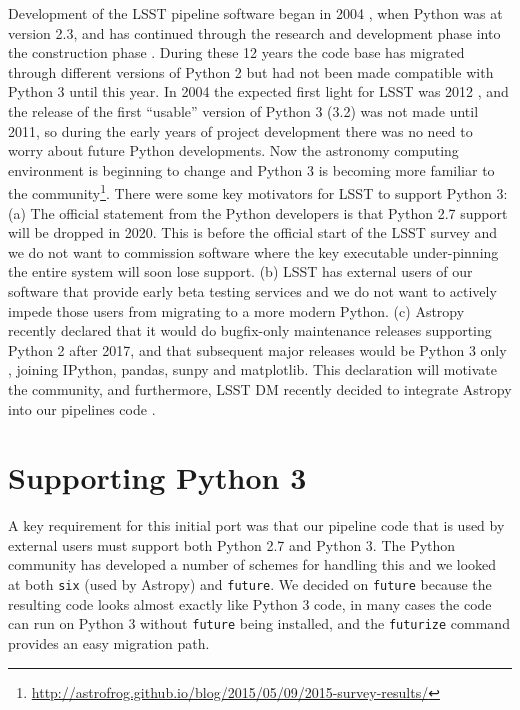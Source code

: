 \documentclass[11pt,twoside]{article}
\begin{document}
Development of the LSST pipeline software began in 2004 \citep{2004AAS...20510811A}, when Python was at version 2.3, and has continued through the research and development phase \citep{2010SPIE.7740E..15A} into the construction phase \citep{P056_adassxxv}.
During these 12 years the code base has migrated through different versions of Python 2 but had not been made compatible with Python 3 until this year.
In 2004 the expected first light for LSST was 2012 \citep{2004SPIE.5489..705C}, and the release of the first ``usable'' version of Python 3 (3.2) was not made until 2011, so during the early years of project development there was no need to worry about future Python developments.
Now the astronomy computing environment is beginning to change and Python 3 is becoming more familiar to the community\footnote{\url{http://astrofrog.github.io/blog/2015/05/09/2015-survey-results/}}.
There were some key motivators for LSST to support Python 3: (a) The official statement from the Python developers is that Python 2.7 support will be dropped in 2020.
This is before the official start of the LSST survey and we do not want to commission software where the key executable under-pinning the entire system will soon lose support.
(b) LSST has external users of our software that provide early beta testing services and we do not want to actively impede those users from migrating to a more modern Python.
(c) Astropy \citep{2013A&A...558A..33A} recently declared that it would do bugfix-only maintenance releases supporting Python 2 after 2017, and that subsequent major releases would be Python 3 only \citep{APE10}, joining IPython, pandas, sunpy and matplotlib. This declaration will motivate the community, and furthermore, LSST DM recently decided to integrate Astropy into our pipelines code \citep{doi:10.1117/12.2231313}.

\section{Supporting Python 3}

A key requirement for this initial port was that our pipeline code that is used by external users must support both Python 2.7 and Python 3.
The Python community has developed a number of schemes for handling this and we looked at both \texttt{six} (used by Astropy) and \texttt{future}.
We decided on \texttt{future} because the resulting code looks almost exactly like Python 3 code, in many cases the code can run on Python 3 without \texttt{future} being installed, and the \texttt{futurize} command provides an easy migration path.
\end{document}
